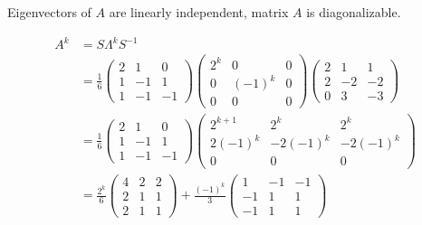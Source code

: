 \documentclass[main.tex]{subfiles}
\begin{document}
\begin{enumerate}
    Eigenvectors of $A$ are linearly independent, matrix $A$ is diagonalizable.

    $$
    \begin{aligned}
    A^{k} &=S \Lambda^{k} S^{-1} \\
    &=\frac{1}{6}\left(\begin{array}{ccc}
    2 & 1 & 0 \\
    1 & -1 & 1 \\
    1 & -1 & -1
    \end{array}\right)\left(\begin{array}{ccc}
    2^{k} & 0 & 0 \\
    0 & (-1)^{k} & 0 \\
    0 & 0 & 0
    \end{array}\right)\left(\begin{array}{ccc}
    2 & 1 & 1 \\
    2 & -2 & -2 \\
    0 & 3 & -3
    \end{array}\right) \\
    &=\frac{1}{6}\left(\begin{array}{ccc}
    2 & 1 & 0 \\
    1 & -1 & 1 \\
    1 & -1 & -1
    \end{array}\right)\left(\begin{array}{ccc}
    2^{k+1} & 2^{k} & 2^{k} \\
    2(-1)^{k} & -2(-1)^{k} & -2(-1)^{k} \\
    0 & 0 & 0
    \end{array}\right) \\
    &=\frac{2^{k}}{6}\left(\begin{array}{ccc}
    4 & 2 & 2 \\
    2 & 1 & 1 \\
    2 & 1 & 1
    \end{array}\right)+\frac{(-1)^{k}}{3}\left(\begin{array}{ccc}
    1 & -1 & -1 \\
    -1 & 1 & 1 \\
    -1 & 1 & 1
    \end{array}\right)
    \end{aligned}
    $$
    
\end{enumerate}
\end{document}

